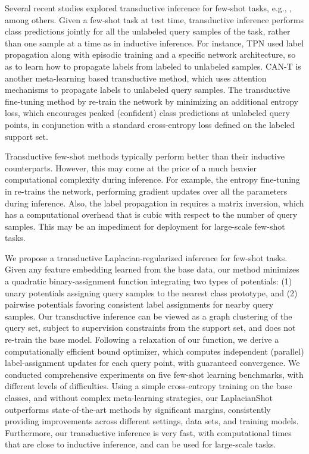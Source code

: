 \documentclass{article}
\begin{document}
Several recent studies explored transductive inference for few-shot tasks, e.g., \cite{liu2018learning,can,Dhillon2020A,hu2020empirical,kim2019edge,team}, among others. Given a few-shot task at test time, transductive inference performs class predictions jointly for all the unlabeled query samples of the task, rather than one sample at a time as in inductive inference.
For instance, TPN \cite{liu2018learning} used label propagation \cite{z2004learning} along with episodic training and a specific network architecture, so as to learn how to propagate labels from labeled to unlabeled samples. CAN-T \cite{can} is another meta-learning based transductive method, which uses attention mechanisms to propagate labels to unlabeled query samples. The transductive fine-tuning method by \cite{Dhillon2020A} re-train the network by minimizing an additional entropy loss, which encourages peaked (confident) class predictions at unlabeled query points, in conjunction with a standard cross-entropy loss defined on the labeled support set. 

Transductive few-shot methods typically perform better than their inductive
counterparts. However, this may come at the price of a much heavier computational complexity during inference. For example, the entropy fine-tuning in \cite{Dhillon2020A} re-trains the network, performing gradient updates over all the parameters during inference. Also, the label propagation in \cite{liu2018learning} requires a matrix inversion, which has a computational overhead that is cubic with respect to the number of query samples. This may be an impediment for deployment for large-scale few-shot tasks.

We propose a transductive Laplacian-regularized inference for few-shot tasks. Given any feature embedding learned from the base data, our method minimizes a quadratic binary-assignment function integrating two 
types of potentials: (1) unary potentials assigning query samples to the nearest class prototype, and (2) pairwise potentials favoring consistent label assignments for nearby query samples. 
Our transductive inference can be viewed as a graph clustering of the query set, subject to supervision constraints from the support set, and does not re-train the base model. Following a relaxation of our function, we derive a computationally efficient bound optimizer, which computes independent (parallel) label-assignment updates for each query point, with guaranteed convergence. We conducted comprehensive experiments on five few-shot learning benchmarks, with different levels of difficulties. Using a simple cross-entropy training on the base classes, and without complex meta-learning strategies, our LaplacianShot outperforms state-of-the-art methods by significant margins, consistently providing improvements across different settings, data sets, and training models. Furthermore, our transductive inference is very fast, with computational times that are close to inductive inference, and can be used for large-scale tasks.
\end{document}
